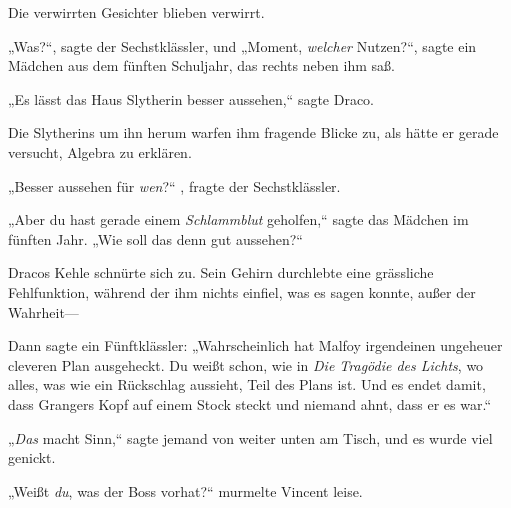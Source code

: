 Die verwirrten Gesichter blieben verwirrt.

„Was?“, sagte der Sechstklässler, und „Moment, \emph{welcher} Nutzen?“, sagte ein Mädchen aus dem fünften Schuljahr, das rechts neben ihm saß.

„Es lässt das Haus Slytherin besser aussehen,“ sagte Draco.

Die Slytherins um ihn herum warfen ihm fragende Blicke zu, als hätte er gerade versucht, Algebra zu erklären.

„Besser aussehen für \emph{wen}?“ , fragte der Sechstklässler.

„Aber du hast gerade einem \emph{Schlammblut} geholfen,“ sagte das Mädchen im fünften Jahr. „Wie soll das denn gut aussehen?“

Dracos Kehle schnürte sich zu. Sein Gehirn durchlebte eine grässliche Fehlfunktion, während der ihm nichts einfiel, was es sagen konnte, außer der Wahrheit—

Dann sagte ein Fünftklässler: „Wahrscheinlich hat Malfoy irgendeinen ungeheuer cleveren Plan ausgeheckt. Du weißt schon, wie in \emph{Die Tragödie des Lichts}, wo alles, was wie ein Rückschlag aussieht, Teil des Plans ist. Und es endet damit, dass Grangers Kopf auf einem Stock steckt und niemand ahnt, dass er es war.“

„\emph{Das} macht Sinn,“ sagte jemand von weiter unten am Tisch, und es wurde viel genickt.

\later

„Weißt \emph{du}, was der Boss vorhat?“ murmelte Vincent leise.

